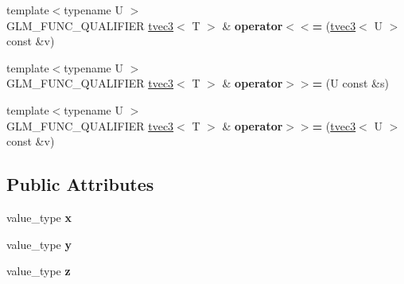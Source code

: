 \begin{DoxyCompactItemize}
\item 
\hypertarget{structglm_1_1detail_1_1tvec3_a144bc8c89483e87d194c3d8d7a18122e}{}{\footnotesize template$<$typename U $>$ }\\G\+L\+M\+\_\+\+F\+U\+N\+C\+\_\+\+Q\+U\+A\+L\+I\+F\+I\+E\+R \hyperlink{structglm_1_1detail_1_1tvec3}{tvec3}$<$ T $>$ \& {\bfseries operator$<$$<$=} (\hyperlink{structglm_1_1detail_1_1tvec3}{tvec3}$<$ U $>$ const \&v)\label{structglm_1_1detail_1_1tvec3_a144bc8c89483e87d194c3d8d7a18122e}

\item 
\hypertarget{structglm_1_1detail_1_1tvec3_a05f0c81f637dc4ac552e325d50e13cbe}{}{\footnotesize template$<$typename U $>$ }\\G\+L\+M\+\_\+\+F\+U\+N\+C\+\_\+\+Q\+U\+A\+L\+I\+F\+I\+E\+R \hyperlink{structglm_1_1detail_1_1tvec3}{tvec3}$<$ T $>$ \& {\bfseries operator$>$$>$=} (U const \&s)\label{structglm_1_1detail_1_1tvec3_a05f0c81f637dc4ac552e325d50e13cbe}

\item 
\hypertarget{structglm_1_1detail_1_1tvec3_a494d52e3813d4d463936dc09afef878e}{}{\footnotesize template$<$typename U $>$ }\\G\+L\+M\+\_\+\+F\+U\+N\+C\+\_\+\+Q\+U\+A\+L\+I\+F\+I\+E\+R \hyperlink{structglm_1_1detail_1_1tvec3}{tvec3}$<$ T $>$ \& {\bfseries operator$>$$>$=} (\hyperlink{structglm_1_1detail_1_1tvec3}{tvec3}$<$ U $>$ const \&v)\label{structglm_1_1detail_1_1tvec3_a494d52e3813d4d463936dc09afef878e}

\end{DoxyCompactItemize}
\subsection*{Public Attributes}
\begin{DoxyCompactItemize}
\item 
\hypertarget{structglm_1_1detail_1_1tvec3_a19977112bc5b09d2fe5dee031f65b350}{}value\+\_\+type {\bfseries x}\label{structglm_1_1detail_1_1tvec3_a19977112bc5b09d2fe5dee031f65b350}

\item 
\hypertarget{structglm_1_1detail_1_1tvec3_af9c969e9bc7a5e7e91db0a605be99940}{}value\+\_\+type {\bfseries y}\label{structglm_1_1detail_1_1tvec3_af9c969e9bc7a5e7e91db0a605be99940}

\item 
\hypertarget{structglm_1_1detail_1_1tvec3_ae2e43bd553ceb55d728fb20b5b10f346}{}value\+\_\+type {\bfseries z}\label{structglm_1_1detail_1_1tvec3_ae2e43bd553ceb55d728fb20b5b10f346}

\end{DoxyCompactItemize}


